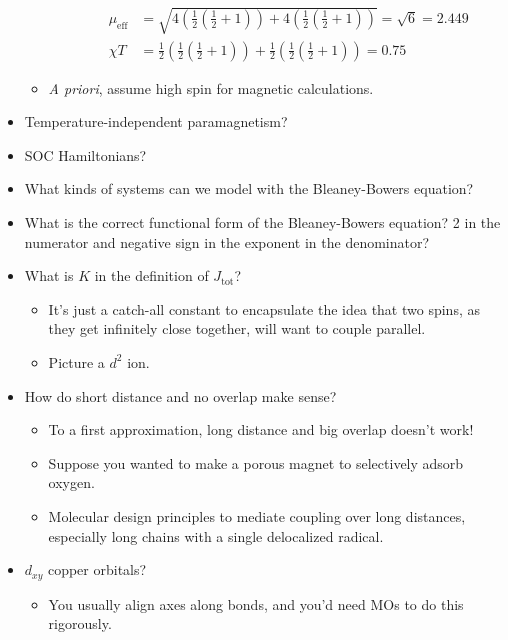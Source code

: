 \documentclass[../notes.tex]{subfiles}
\begin{document}
\begin{itemize}
\begin{itemize}
\begin{itemize}
            \begin{align*}
                \mu_\text{eff} &= \sqrt{4\left( \frac{1}{2}\left( \frac{1}{2}+1 \right) \right)+4\left( \frac{1}{2}\left( \frac{1}{2}+1 \right) \right)} = \sqrt{6} = 2.449\\
                \chi T &= \frac{1}{2}\left( \frac{1}{2}\left( \frac{1}{2}+1 \right) \right)+\frac{1}{2}\left( \frac{1}{2}\left( \frac{1}{2}+1 \right) \right) = 0.75
            \end{align*}
        \end{itemize}
        \item \emph{A priori}, assume high spin for magnetic calculations.
    \end{itemize}
    \item Temperature-independent paramagnetism?
    \item SOC Hamiltonians?
    \item What kinds of systems can we model with the Bleaney-Bowers equation?
    \item What is the correct functional form of the Bleaney-Bowers equation? 2 in the numerator and negative sign in the exponent in the denominator?
    \item What is $K$ in the definition of $J_\text{tot}$?
    \begin{itemize}
        \item It's just a catch-all constant to encapsulate the idea that two spins, as they get infinitely close together, will want to couple parallel.
        \item Picture a $d^2$  ion.
    \end{itemize}
    \item How do short distance and no overlap make sense?
    \begin{itemize}
        \item To a first approximation, long distance and big overlap doesn't work!
        \item Suppose you wanted to make a porous magnet to selectively adsorb oxygen.
        \item Molecular design principles to mediate coupling over long distances, especially long chains with a single delocalized radical.
    \end{itemize}
    \item $d_{xy}$ copper orbitals?
    \begin{itemize}
        \item You usually align axes along bonds, and you'd need MOs to do this rigorously.

\end{itemize}
\end{itemize}
\end{document}
